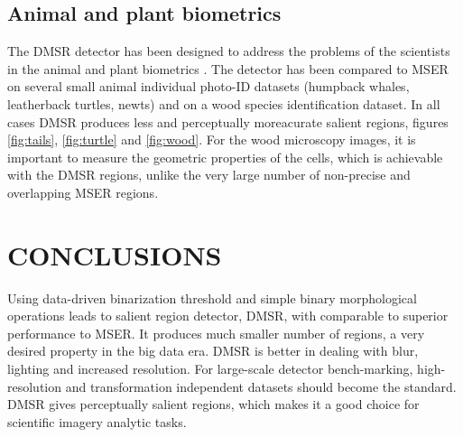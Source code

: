 \documentclass{article}
\begin{document}
\subsection{Animal and plant biometrics}
\label{ssec:bio}
The DMSR detector has been designed to address the problems of the scientists in the animal and plant biometrics \cite{Kuehl2013}. The detector has been compared to MSER on several small animal individual photo-ID datasets (humpback whales, leatherback turtles, newts) and on a wood species identification dataset. In all cases DMSR produces less and perceptually moreacurate salient regions, figures \ref{fig:tails}, \ref{fig:turtle} and \ref{fig:wood}. For the wood microscopy images, it is important to measure the geometric properties of the cells, which is achievable with the DMSR regions, unlike the very large number of non-precise and overlapping MSER regions.

\section{CONCLUSIONS}
Using data-driven binarization threshold and simple binary morphological operations leads to salient region detector, DMSR, with comparable to superior performance to MSER. It produces much smaller number of regions, a very desired property in the big data era. DMSR is better in dealing with blur, lighting and increased resolution.  For large-scale detector bench-marking, high-resolution and transformation independent datasets should become the standard. DMSR gives perceptually salient regions, which makes it a good choice for scientific imagery analytic tasks.  
\label{sec:concl}










\end{document}
